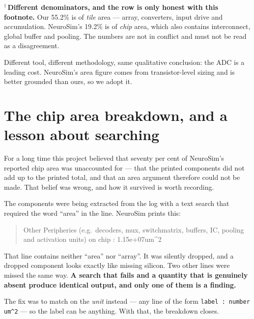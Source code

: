 \documentclass[11pt,a4paper]{report}
\begin{document}
$^\dagger$\,\textbf{Different denominators, and the row is only honest with
this footnote.} Our 55.2\% is of \emph{tile} area --- array, converters, input
drive and accumulation. NeuroSim's 19.2\% is of \emph{chip} area, which also
contains interconnect, global buffer and pooling. The numbers are not in
conflict and must not be read as a disagreement.

Different tool, different methodology, same qualitative conclusion: the ADC
is a leading cost. NeuroSim's area figure comes from transistor-level sizing and is
better grounded than ours, so we adopt it.

\section{The chip area breakdown, and a lesson about searching}

For a long time this project believed that seventy per cent of NeuroSim's
reported chip area was unaccounted for --- that the printed components did not
add up to the printed total, and that an area argument therefore could not be
made. That belief was wrong, and how it survived is worth recording.

The components were being extracted from the log with a text search that
required the word ``area'' in the line. NeuroSim prints this:

\begin{quote}\small\ttfamily
Other Peripheries (e.g.\ decoders, mux, switchmatrix, buffers, IC, pooling and
activation units) on chip : 1.15e+07um\^{}2
\end{quote}

That line contains neither ``area'' nor ``array''. It was silently dropped,
and a dropped component looks exactly like missing silicon. Two other lines
were missed the same way. \textbf{A search that fails and a quantity that is
genuinely absent produce identical output, and only one of them is a finding.}

The fix was to match on the \emph{unit} instead --- any line of the form
\texttt{label : number um\^{}2} --- so the label can be anything. With that,
the breakdown closes.
\end{document}
